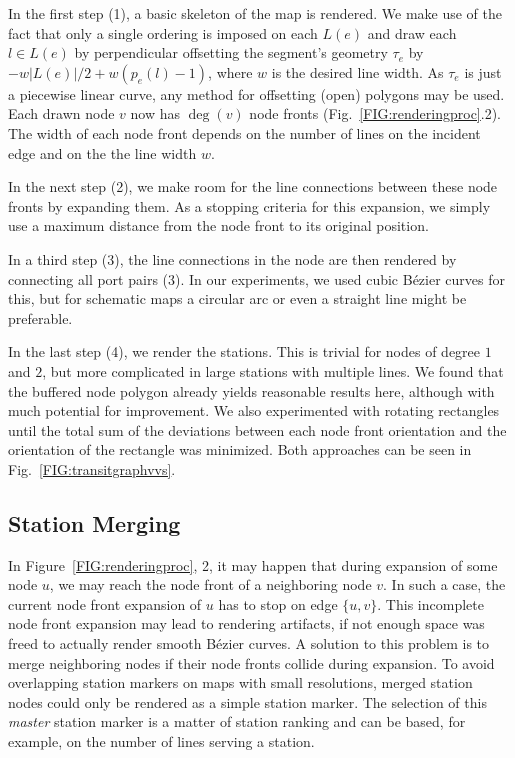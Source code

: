 \documentclass[format=acmsmall, review=false, screen=true]{acmart}
\begin{document}
In the first step (1), a basic skeleton of the map is rendered. We make use of the fact that only a single ordering is imposed on each $L(e)$ and draw each $l \in L(e)$ by perpendicular offsetting the segment's geometry $\tau_{e}$ by $-w\left|L(e)\right|/2 + w\left(p_{e}(l)-1\right)$, where $w$ is the desired line width. As $\tau_{e}$ is just a piecewise linear curve, any method for offsetting (open) polygons may be used. Each drawn node $v$ now has $\deg(v)$ node fronts (Fig.~\ref{FIG:renderingproc}.2). The width of each node front depends on the number of lines on the incident edge and on the the line width $w$. 

In the next step (2), we make room for the line connections between these node fronts by expanding them. As a stopping criteria for this expansion, we simply use a maximum distance from the node front to its original position. 

In a third step (3), the line connections in the node are then rendered by connecting all port pairs (3). In our experiments, we used cubic B\'ezier curves for this, but for schematic maps a circular arc or even a straight line might be preferable.

In the last step (4), we render the stations. This is trivial for nodes of degree $1$ and $2$, but more complicated in large stations with multiple lines. We found that the buffered node polygon already yields reasonable results here, although with much potential for improvement. We also experimented with rotating rectangles until the total sum of the deviations between each node front orientation and the orientation of the rectangle was minimized. Both approaches can be seen in Fig.~\ref{FIG:transitgraphvvs}.

\subsection{Station Merging}

In Figure~\ref{FIG:renderingproc}, 2, it may happen that during expansion of some node $u$, we may reach the node front of a neighboring node $v$.
In such a case, the current node front expansion of $u$ has to stop on edge $\{u, v\}$.
This incomplete node front expansion may lead to rendering artifacts, if not enough space was freed to actually render smooth B\'ezier curves.
A solution to this problem is to merge neighboring nodes if their node fronts collide during expansion.
To avoid overlapping station markers on maps with small resolutions, merged station nodes could only be rendered as a simple station marker.
The selection of this \emph{master} station marker is a matter of station ranking and can be based, for example, on the number of lines serving a station.
\end{document}

